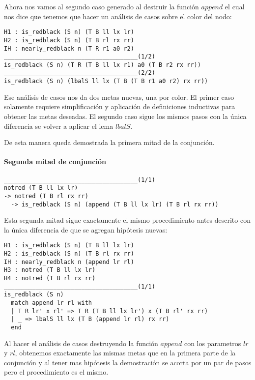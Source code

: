 Ahora nos vamos al segundo caso generado al destruir la funci\'on \hyperref[func_app]{$append$} el 
cual nos dice que tenemos que hacer un análisis de casos sobre el color del nodo:

\begin{verbatim}
H1 : is_redblack (S n) (T B ll lx lr)
H2 : is_redblack (S n) (T B rl rx rr)
IH : nearly_redblack n (T R r1 a0 r2)
______________________________________(1/2)
is_redblack (S n) (T R (T B ll lx r1) a0 (T B r2 rx rr))
______________________________________(2/2)
is_redblack (S n) (lbalS ll lx (T B (T B r1 a0 r2) rx rr))
\end{verbatim}

Ese análisis de casos nos da dos metas nuevas, una por color. El primer caso solamente requiere
simplificaci\'on y aplicaci\'on de definiciones inductivas para obtener las metas deseadas. El
segundo caso sigue los mismos pasos con la única diferencia se volver a aplicar el lema 
\hyperref[lbalS]{$lbalS$}.

De esta manera queda demostrada la primera mitad de la conjunci\'on.

\paragraph{Segunda mitad de conjunci\'on}

\begin{verbatim}
______________________________________(1/1)
notred (T B ll lx lr)
-> notred (T B rl rx rr)
  -> is_redblack (S n) (append (T B ll lx lr) (T B rl rx rr))
\end{verbatim}

Esta segunda mitad sigue exactamente el mismo procedimiento antes descrito con la \'unica
diferencia de que se agregan hip\'otesis nuevas:

\begin{verbatim}
H1 : is_redblack (S n) (T B ll lx lr)
H2 : is_redblack (S n) (T B rl rx rr)
IH : nearly_redblack n (append lr rl)
H3 : notred (T B ll lx lr)
H4 : notred (T B rl rx rr)
______________________________________(1/1)
is_redblack (S n)
  match append lr rl with
  | T R lr' x rl' => T R (T B ll lx lr') x (T B rl' rx rr)
  | _ => lbalS ll lx (T B (append lr rl) rx rr)
  end
\end{verbatim}

Al hacer el análisis de casos destruyendo la funci\'on \hyperref[func_app]{$append$} con los 
parametros $lr$ y $rl$, obtenemos exactamente las mismas metas que en la primera parte de la 
conjunci\'on y al tener mas hipótesis la demostraci\'on se acorta por un par de pasos pero el 
procedimiento es el mismo.

